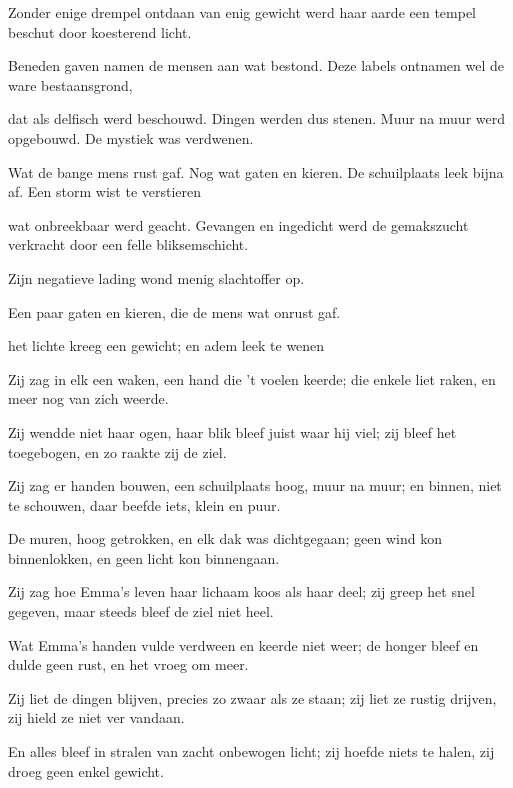 Zonder enige drempel
ontdaan van enig gewicht
werd haar aarde een tempel
beschut door koesterend licht.

Beneden gaven namen
de mensen aan wat bestond.
Deze labels ontnamen
wel de ware bestaansgrond,

dat als delfisch werd beschouwd.
Dingen werden dus stenen.
Muur na muur werd opgebouwd.
De mystiek was verdwenen.

Wat de bange mens rust gaf.
Nog wat gaten en kieren.
De schuilplaats leek bijna af.
Een storm wist te verstieren

wat onbreekbaar werd geacht.
Gevangen en ingedicht
werd de gemakszucht verkracht
door een felle bliksemschicht.

Zijn negatieve lading
wond menig slachtoffer op.





Een paar gaten en kieren,
die de mens wat onrust gaf.


het lichte kreeg een gewicht;
en adem leek te wenen


Zij zag in elk een waken,
een hand die 't voelen keerde;
die enkele liet raken,
en meer nog van zich weerde.

Zij wendde niet haar ogen,
haar blik bleef juist waar hij viel;
zij bleef het toegebogen,
en zo raakte zij de ziel.

Zij zag er handen bouwen,
een schuilplaats hoog, muur na muur;
en binnen, niet te schouwen,
daar beefde iets, klein en puur.

De muren, hoog getrokken,
en elk dak was dichtgegaan;
geen wind kon binnenlokken,
en geen licht kon binnengaan.

Zij zag hoe Emma's leven
haar lichaam koos als haar deel;
zij greep het snel gegeven,
maar steeds bleef de ziel niet heel.

Wat Emma's handen vulde
verdween en keerde niet weer;
de honger bleef en dulde
geen rust, en het vroeg om meer.

Zij liet de dingen blijven,
precies zo zwaar als ze staan;
zij liet ze rustig drijven,
zij hield ze niet ver vandaan.

En alles bleef in stralen
van zacht onbewogen licht;
zij hoefde niets te halen,
zij droeg geen enkel gewicht.


